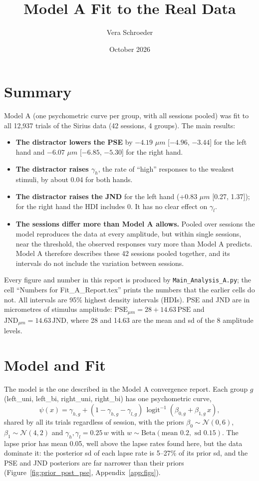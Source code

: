\documentclass[11pt]{article}
\title{Model A Fit to the Real Data}
\author{Vera Schroeder}
\date{October 2026}
\newcommand{\invlogit}{\operatorname{logit}^{-1}}
\newcommand{\code}[1]{\texttt{#1}}
\begin{document}
\maketitle

\section{Summary}

Model A (one psychometric curve per group, with all sessions pooled) was fit to
all 12{,}937 trials of the Sirius data (42 sessions, 4 groups). The main results:

\begin{itemize}
  \item \textbf{The distractor lowers the PSE} by $-4.19$ $\mu m$
        [$-4.96$, $-3.44$] for the left hand and $-6.07$ $\mu m$ [$-6.85$, $-5.30$]
        for the right hand.
  \item \textbf{The distractor raises $\gamma_h$}, the rate of ``high''
        responses to the weakest stimuli, by about 0.04 for both hands.
  \item \textbf{The distractor raises the JND} for the left hand
        (+0.83 $\mu m$ [0.27, 1.37]); for the right hand the HDI includes 0. It
        has no clear effect on $\gamma_l$.
  \item \textbf{The sessions differ more than Model A allows.} Pooled over
        sessions the model reproduces the data at every amplitude, but within
        single sessions, near the threshold, the observed responses vary more than
        Model A predicts. Model A therefore describes these 42 sessions pooled
        together, and its intervals do not include the variation between
        sessions.
\end{itemize}

Every figure and number in this report is produced by
\code{Main\_Analysis\_A.py}; the cell ``Numbers for Fit\_A\_Report.tex'' prints
the numbers that the earlier cells do not. All intervals are 95\% highest
density intervals (HDIs). PSE and JND are in micrometres of stimulus amplitude:
$\text{PSE}_{\mu m} = 28 + 14.63\,\text{PSE}$ and
$\text{JND}_{\mu m} = 14.63\,\text{JND}$, where 28 and 14.63 are the mean and sd
of the 8 amplitude levels.

\section{Model and Fit}

The model is the one described in the Model A convergence report. Each group
$g$ (left\_uni, left\_bi, right\_uni, right\_bi) has one psychometric curve,
\[
  \psi(x) = \gamma_{h,g} + (1 - \gamma_{h,g} - \gamma_{l,g})\,\invlogit(\beta_{0,g} + \beta_{1,g}\,x),
\]
shared by all its trials regardless of session, with the priors
$\beta_0 \sim \mathcal{N}(0, 6)$, $\beta_1 \sim \mathcal{N}(4, 2)$ and
$\gamma_h, \gamma_l = 0.25\,w$ with $w \sim \text{Beta}(\text{mean } 0.2,
\text{ sd } 0.15)$. The lapse prior has mean 0.05, well above the lapse rates found here, but the
data dominate it: the posterior sd of each lapse rate is 5--27\% of its prior
sd, and the PSE and JND posteriors are far narrower than their priors
(Figure~\ref{fig:prior_post_pse}, Appendix~\ref{app:figs}).
\end{document}
